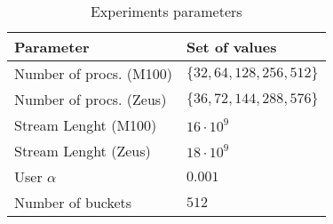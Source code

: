 \documentclass{article}
\begin{document}
\begin{table}
	\small
	\caption{Experiments parameters}
	\label{parameters}
	\centering
	\begin{tabular}{@{}ll@{}}
		\textbf{Parameter} & \textbf{Set of values}\\
		\hline
		Number of procs. (M100)& $\{32, 64, 128, 256, 512\}$ \\
		Number of procs. (Zeus)& $\{36, 72, 144, 288, 576\}$ \\
		Stream Lenght (M100) & $16\cdot10^9$ \\
		Stream Lenght (Zeus) & $18\cdot10^9$ \\
		User $\alpha$ & $0.001$ \\
		Number of buckets & $512$ \\
	\end{tabular}
\end{table}
\end{document}
